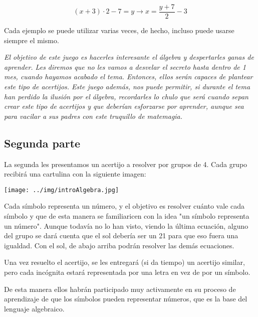 \[
(x + 3)·2 - 7 = y \to x = \frac{y+7}{2} - 3
\]


Cada ejemplo se puede utilizar varias veces, de hecho, incluso puede usarse siempre el mismo.

\textit{El objetivo de este juego es hacerles interesante el álgebra y despertarles  ganas de aprender. 
%
Les diremos que no les vamos a desvelar el secreto hasta dentro de 1 mes, cuando hayamos acabado el tema.
%
Entonces, ellos serán capaces de plantear este tipo de acertijos.
%
Este juego además, nos puede permitir, si durante el tema han perdido la ilusión por el álgebra, recordarles lo chulo que será cuando sepan crear este tipo de acertijos y que deberían esforzarse por aprender, aunque sea para vacilar a sus padres con este truquillo de matemagia.
}

\newpage

\subsection{Segunda parte}

La segunda les presentamos un acertijo a resolver por grupos de 4. Cada grupo recibirá una cartulina con la siguiente imagen:

\begin{center}
\texttt{[image: ../img/introAlgebra.jpg]}
\end{center}

Cada símbolo representa un número, y el objetivo es resolver cuánto vale cada símbolo y que de esta manera se familiaricen con la idea "un símbolo representa un número". 
%
Aunque todavía no lo han visto, viendo la última ecuación, alguno del grupo se dará cuenta que el sol debería ser un 21 para que eso fuera una igualdad. Con el sol, de abajo arriba podrán resolver las demás ecuaciones.


Una vez resuelto el acertijo, se les entregará (si da tiempo) un acertijo similar, pero cada incógnita estará representada por una letra en vez de por un símbolo.


De esta manera ellos habrán participado muy activamente en su proceso de aprendizaje de que los símbolos pueden representar números, que es la base del lenguaje algebraico.


